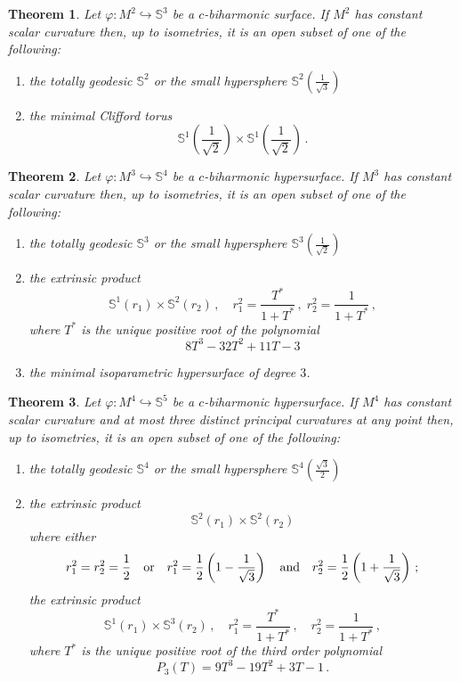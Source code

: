 \documentclass[11pt,leqno]{amsart}
\theoremstyle{plain}
\newtheorem{theorem}                {Theorem}      [section]
\theoremstyle{definition}
\numberwithin{equation}{section}
\def \s{{\mathbb S}}
\numberwithin{equation}{section}
\begin{document}
\begin{theorem}\label{teo2-m=2-remark}
Let $\varphi: M^2 \hookrightarrow \s^3$ be a $c$-biharmonic surface. If $M^2$ has constant scalar curvature then, up to isometries, it is an open subset of one of the following:
\begin{enumerate}
\item[(i)] the totally geodesic $\s^2$ or the small hypersphere $\s^2\left(\frac{1}{\sqrt{3}}\right)$
\item[(ii)] the minimal Clifford torus 
$$
\s^1\left(\frac{1}{\sqrt 2}\right) \times \s^1\left(\frac{1}{\sqrt 2}\right)\,.
$$
\end{enumerate}
\end{theorem}  

\begin{theorem}\label{teo2-remark}
Let $\varphi: M^3 \hookrightarrow \s^4$ be a $c$-biharmonic hypersurface. If $M^3$ has constant scalar curvature then, up to isometries, it is an open subset of one of the following:
\begin{enumerate}
\item[(i)] the totally geodesic $\s^3$ or the small hypersphere $\s^3\left(\frac{1}{\sqrt{2}}\right)$
\item[(ii)] the extrinsic product 
$$
\s^1\left(r_1\right) \times \s^2\left(r_2\right)\,,\quad r_1^2=\frac{T^*}{1+T^*}\,,\; r_2^2=\frac{1}{1+T^*}\,,
$$
where $T^*$ is the unique positive root of the polynomial 
$$
8  T^3-32  T^2+11  T-3
$$
\item[(iii)] the minimal isoparametric hypersurface of degree $3$.
\end{enumerate}
\end{theorem}

\begin{theorem}\label{teo2-m=4-remark}
Let $\varphi: M^4 \hookrightarrow \s^5$ be a $c$-biharmonic hypersurface. If $M^4$ has constant scalar curvature and at most three distinct principal curvatures at any point then, up to isometries, it is an open subset of one of the following:
\begin{enumerate}
\item[(i)] the totally geodesic $\s^4$ or the small hypersphere $\s^4\left(\frac{\sqrt 3}{2}\right)$
\item[(ii)] the extrinsic product 
$$
\s^2\left(r_1\right) \times \s^2\left(r_2\right)
$$
where either
$$
r_1^2=r_2^2=\frac{1}{2}\quad {\rm or}\quad r_1^2=\frac{1}{2}\left (1-\frac{1}{\sqrt 3} \right )\quad {\rm and}\quad r_2^2=\frac{1}{2}\left (1+\frac{1}{\sqrt 3} \right )\,;
$$
the extrinsic product 
$$
\s^1\left(r_1\right) \times \s^3\left(r_2\right)\,,\quad r_1^2=\frac{T^*}{1+T^*}\,,\quad r_2^2=\frac{1}{1+T^*}\,,
$$
where $T^*$ is the unique positive root of the third order polynomial
\begin{equation}\label{eq:P3(T)}
P_3(T)=9 T^3-19  T^2+3 T-1\,.
\end{equation}
\end{enumerate}
\end{theorem}
\end{document}
